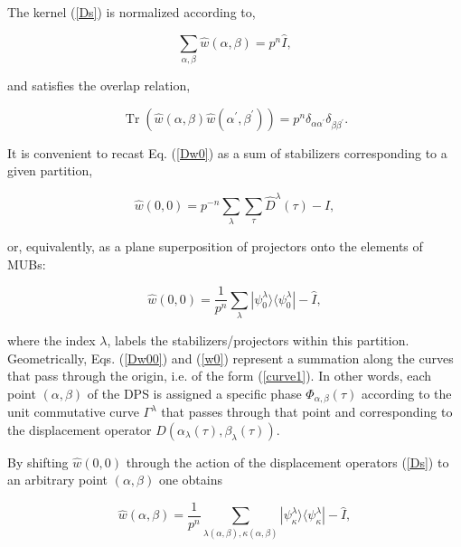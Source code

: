 \documentclass[quantumrep,article,submit,pdftex,moreauthors]{Definitions/mdpi}
\DeclareMathOperator{\Tr}{Tr}
\begin{document}
The kernel (\ref{Ds}) is normalized according to, 

\begin{equation}
  \sum_{\alpha,\beta}\hat{w}\left(\alpha,\beta\right) = p^{n}\hat{I},
\end{equation}

and satisfies the overlap relation, 

\begin{equation}
  \Tr\left(
    \hat{w}(\alpha,\beta)\hat{w}(\alpha^{\prime},\beta^{\prime})
  \right)
  = p^{n} \delta_{\alpha \alpha^{\prime}} \delta_{\beta \beta^{\prime}}.
\end{equation}

It is convenient to recast Eq. (\ref{Dw0}) as a sum of stabilizers
corresponding to a given partition, 

\begin{equation}
  \hat{w}\left(0,0\right)
  = p^{-n} \sum_{\lambda} \sum_{\tau} \hat{D}^{\lambda}(\tau)-\hat{I},
  \label{Dw00}
\end{equation}

or, equivalently, as a plane superposition of projectors onto the elements of
MUBs:

\begin{equation}
  \hat{w}\left(0,0\right)
  = \frac{1}{p^{n}} \sum_{\lambda}
  |\psi_{0}^{\lambda}\rangle \langle \psi_{0}^{\lambda }|
  - \hat{I},
  \label{w0}
\end{equation}

where the index $\lambda$, labels the stabilizers/projectors within this
partition. Geometrically, Eqs. (\ref{Dw00}) and (\ref{w0}) represent a
summation along the curves that pass through the origin, i.e. of the form
(\ref{curve1}). In other words, each point $(\alpha,\beta)$ of the DPS is assigned
a specific phase $\Phi_{\alpha,\beta } \left( \tau \right)$ according to the
unit commutative curve $\Gamma^{\lambda}$ that passes through that point and
corresponding to the displacement operator $D\left(\alpha_{\lambda }(\tau
),\beta_{\lambda }(\tau)\right)$.

By shifting $\hat{w}\left(0,0\right)$ through the action of the
displacement operators (\ref{Ds}) to an arbitrary point $(\alpha,\beta )$
one obtains 

\begin{equation}
  \hat{w}(\alpha,\beta)
  = \frac{1}{p^{n}} \sum_{\lambda (\alpha,\beta),\kappa(\alpha ,\beta )}
  |\psi_{\kappa}^{\lambda}\rangle \langle \psi_{\kappa}^{\lambda }|
  - \hat{I},
  \label{wab}
\end{equation}
\end{document}
